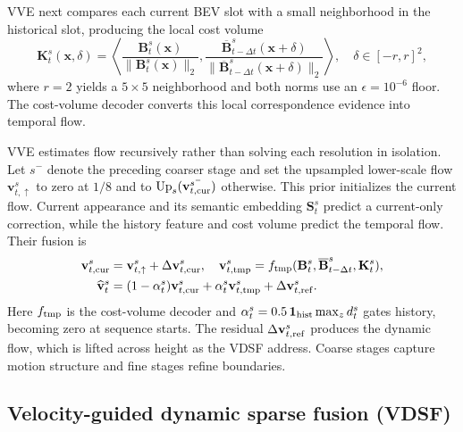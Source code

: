 \documentclass{article}
\begin{document}
VVE next compares each current BEV slot with a small neighborhood in the
historical slot, producing the local cost volume
\begin{equation}
  \mathbf K_t^s(\mathbf x,\delta)=
  \left\langle
    \frac{\mathbf B_t^s(\mathbf x)}{\|\mathbf B_t^s(\mathbf x)\|_2},
    \frac{\overline{\mathbf B}_{t-\Delta t}^s(\mathbf x+\delta)}
         {\|\overline{\mathbf B}_{t-\Delta t}^s(\mathbf x+\delta)\|_2}
  \right\rangle,
  \quad \delta\in[-r,r]^2,
  \label{eq:cost_volume}
\end{equation}
where $r=2$ yields a $5\times5$ neighborhood and both norms use an
$\epsilon=10^{-6}$ floor. The cost-volume decoder converts this local
correspondence evidence into temporal flow.

VVE estimates flow recursively rather than solving each resolution in
isolation. Let $s^-$ denote the preceding coarser stage and set the upsampled
lower-scale flow $\mathbf v_{t,\uparrow}^s$ to zero at $1/8$ and to
$\operatorname{Up}_s(\mathbf v_{t,\rm cur}^{s^-})$ otherwise. This prior
initializes the current flow. Current appearance and its semantic embedding
$\mathbf S_t^s$ predict a
current-only correction, while the history feature and cost volume predict the
temporal flow. Their fusion is
\begin{equation}
 \begin{aligned}
  \mathbf v_{t,\rm cur}^s
    &=\mathbf v_{t,\uparrow}^s+\Delta\mathbf v_{t,\rm cur}^s,
  \quad \mathbf v_{t,\rm tmp}^s
    =f_{\rm tmp}(\mathbf B_t^s,\overline{\mathbf B}_{t-\Delta t}^s,
      \mathbf K_t^s),
      \\\widehat{\mathbf v}_t^s
    &=(1-\alpha_t^s)\mathbf v_{t,\rm cur}^s
      +\alpha_t^s\mathbf v_{t,\rm tmp}^s
      +\Delta\mathbf v_{t,\rm ref}^s.
 \end{aligned}
  \label{eq:velocity_prior}
\end{equation}
Here $f_{\rm tmp}$ is the cost-volume decoder and
$\alpha_t^s=0.5\,\mathbf 1_{\rm hist}\max_z d_t^s$ gates history, becoming zero
at sequence starts. The residual $\Delta\mathbf v_{t,\rm ref}^s$ produces the
dynamic flow, which is lifted across height as the VDSF address. Coarse stages
capture motion structure and fine stages refine boundaries.

\subsection{Velocity-guided dynamic sparse fusion (VDSF)}
\label{sec:vdsf}
\end{document}
